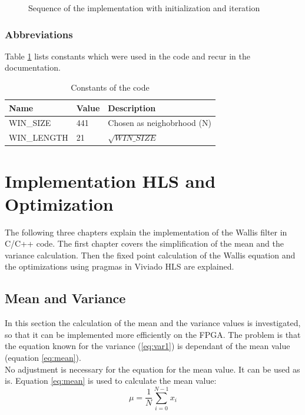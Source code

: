 \begin{figure}[tb!]
    \centering
    \begin{adjustbox}{max width=\textwidth}
        
    \end{adjustbox}
    \caption{Sequence of the implementation with initialization and iteration}
    \label{fig:sequence}
\end{figure}

\subsubsection*{Abbreviations}
Table \ref{tab:ip:abbreviations} lists constants which were used in the code and recur in the documentation.

\begin{table}[tb!]
    \centering
    \begin{tabular}{l l l}
        \toprule
        Name & Value & Description  \\
        \midrule
        WIN\_SIZE & 441 & Chosen as neighobrhood (N)
        \\
        WIN\_LENGTH & 21 & $\sqrt{WIN\_SIZE}$ 
        \\
        \bottomrule
    \end{tabular}
    \caption{Constants of the code}
    \label{tab:ip:abbreviations}
\end{table}


\section{Implementation HLS and Optimization} \label{ch:ip:hls_opt}
The following three chapters explain the implementation of the Wallis filter in
C/C++ code. The first chapter covers the simplification of the mean and the
variance calculation. Then the fixed point calculation of the Wallis equation
and the optimizations using pragmas in Viviado HLS are explained.

\subsection{Mean and Variance} \label{ch:ip:mean_var}
In this section the calculation of the mean and the variance values is
investigated, so that it can be implemented more efficiently on the FPGA. The problem is that the equation known for the variance (\ref{eq:var1}) is dependant of the mean value (equation \ref{eq:mean}).\\
No adjustment is necessary for the equation for the mean value. It can be used as is. Equation \ref{eq:mean} is used to calculate the mean value:
\begin{equation}
    \mu = \frac{1}{N} \sum_{i = 0}^{N - 1} x_{i}
    \label{eq:mean}
\end{equation} 

